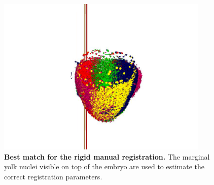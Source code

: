 \begin{figure}
\begin{center}
\includegraphics[width=0.9\textwidth]{../../images/Reconstruction/washington/manual_registration_final.png}
\end{center}
\caption{\textbf{Best match for the rigid manual registration. } The marginal yolk nuclei visible on top of the embryo are used to estimate the correct registration parameters. }
\label{washington_manual_registration_final}
\end{figure}

